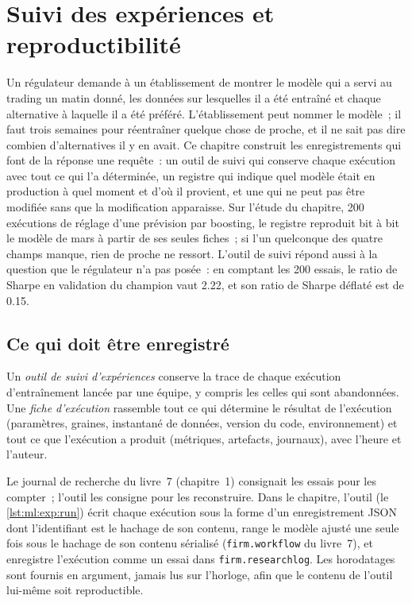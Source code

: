 \chapter{Suivi des expériences et reproductibilité}\label{ch:ml:experiment-tracking-and-reproducibility}

Un régulateur demande à un établissement de montrer le modèle qui a servi au trading un matin donné, les données sur lesquelles il a été entraîné et chaque alternative
à laquelle il a été préféré. L'établissement peut nommer le modèle~; il faut trois semaines pour réentraîner quelque chose de proche, et il ne sait pas dire combien
d'alternatives il y en avait. Ce chapitre construit les enregistrements qui font de la réponse une requête~: un outil de suivi qui conserve chaque exécution
avec tout ce qui l'a déterminée, un registre qui indique quel modèle était en production à quel moment et d'où il provient, et une
 qui ne peut pas être modifiée sans que la modification apparaisse. Sur l'étude du chapitre, 200 exécutions de réglage d'une prévision par boosting, le
registre reproduit bit à bit le modèle de mars à partir de ses seules fiches~; si l'un quelconque des quatre champs manque, rien de proche
ne ressort. L'outil de suivi répond aussi à la question que le régulateur n'a pas posée~: en comptant les 200 essais, le ratio de Sharpe en validation du champion
vaut 2.22, et son ratio de Sharpe déflaté est de 0.15.

\section{Ce qui doit être enregistré}

\begin{definition}\label{def:ml:experiment-tracking-and-reproducibility:tracker}
Un \emph{outil de suivi d'expériences} conserve la trace de chaque exécution d'entraînement lancée par une équipe, y compris les
celles qui sont abandonnées. Une \emph{fiche d'exécution} rassemble
tout ce qui détermine le résultat de l'exécution (paramètres, graines, instantané de données, version du code, environnement) et
tout ce que l'exécution a produit (métriques, artefacts, journaux), avec l'heure et l'auteur.
\end{definition}

Le journal de recherche du livre~7 (chapitre~1) consignait les essais pour les compter~; l'outil les consigne pour les reconstruire. Dans le chapitre,
l'outil (le \cref{lst:ml:exp:run}) écrit chaque exécution sous la forme d'un enregistrement JSON dont l'identifiant est le hachage de son contenu, range le modèle ajusté
une seule fois sous le hachage de son contenu sérialisé (\texttt{firm.workflow} du livre~7), et enregistre l'exécution comme un essai dans
\texttt{firm.researchlog}. Les horodatages sont fournis en argument, jamais lus sur l'horloge, afin que le contenu de l'outil
lui-même soit reproductible.

